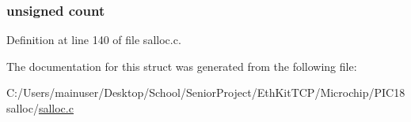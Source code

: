\subsubsection[{count}]{\setlength{\rightskip}{0pt plus 5cm}unsigned count}\label{struct___s_a_l_l_o_c_1_1___b_i_t_s_a6a9e89d63eb610dfe238b0a840979421}


Definition at line 140 of file salloc.\+c.



The documentation for this struct was generated from the following file\+:\begin{DoxyCompactItemize}
\item 
C\+:/\+Users/mainuser/\+Desktop/\+School/\+Senior\+Project/\+Eth\+Kit\+T\+C\+P/\+Microchip/\+P\+I\+C18 salloc/\hyperlink{salloc_8c}{salloc.\+c}\end{DoxyCompactItemize}
